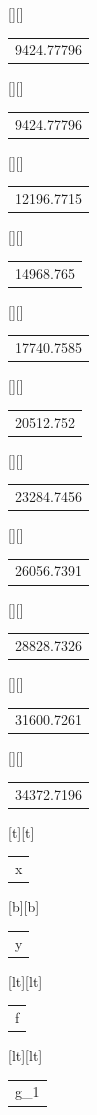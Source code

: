 \begin{psfrags}
[][]{\color[rgb]{0,0,0}\setlength{\tabcolsep}{0pt}\begin{tabular}{c}9424.77796\end{tabular}}%
[][]{\color[rgb]{0,0,0}\setlength{\tabcolsep}{0pt}\begin{tabular}{c}9424.77796\end{tabular}}%
[][]{\color[rgb]{0,0,0}\setlength{\tabcolsep}{0pt}\begin{tabular}{c}12196.7715\end{tabular}}%
[][]{\color[rgb]{0,0,0}\setlength{\tabcolsep}{0pt}\begin{tabular}{c}14968.765\end{tabular}}%
[][]{\color[rgb]{0,0,0}\setlength{\tabcolsep}{0pt}\begin{tabular}{c}17740.7585\end{tabular}}%
[][]{\color[rgb]{0,0,0}\setlength{\tabcolsep}{0pt}\begin{tabular}{c}20512.752\end{tabular}}%
[][]{\color[rgb]{0,0,0}\setlength{\tabcolsep}{0pt}\begin{tabular}{c}23284.7456\end{tabular}}%
[][]{\color[rgb]{0,0,0}\setlength{\tabcolsep}{0pt}\begin{tabular}{c}26056.7391\end{tabular}}%
[][]{\color[rgb]{0,0,0}\setlength{\tabcolsep}{0pt}\begin{tabular}{c}28828.7326\end{tabular}}%
[][]{\color[rgb]{0,0,0}\setlength{\tabcolsep}{0pt}\begin{tabular}{c}31600.7261\end{tabular}}%
[][]{\color[rgb]{0,0,0}\setlength{\tabcolsep}{0pt}\begin{tabular}{c}34372.7196\end{tabular}}%
[t][t]{\color[rgb]{0,0,0}\setlength{\tabcolsep}{0pt}\begin{tabular}{c}x\end{tabular}}%
[b][b]{\color[rgb]{0,0,0}\setlength{\tabcolsep}{0pt}\begin{tabular}{c}y\end{tabular}}%
[lt][lt]{\color[rgb]{0,0,0}\setlength{\tabcolsep}{0pt}\begin{tabular}{l}f\end{tabular}}%
[lt][lt]{\color[rgb]{0,0,0}\setlength{\tabcolsep}{0pt}\begin{tabular}{l}g_1\end{tabular}}%

\end{psfrags}
